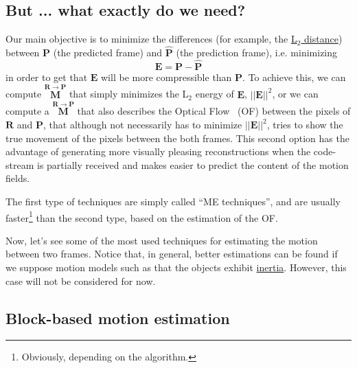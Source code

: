 \subsection{But ... what exactly do we need?}
Our main objective is to minimize the differences (for example, the
\href{https://en.wikipedia.org/wiki/Euclidean_distance}{L$_2$
  distance}) between ${\mathbf P}$ (the predicted frame) and $\hat{\mathbf P}$ (the
prediction frame), i.e. minimizing
\begin{equation}
  {\mathbf E} = {\mathbf P} - \hat{\mathbf P}
\end{equation}
in order to get that ${\mathbf E}$ will be more compressible than
${\mathbf P}$. To achieve this, we can compute $\overset{{\mathbf
    R}\rightarrow {\mathbf P}}{\mathbf M}$ that simply minimizes the
L$_2$ energy of ${\mathbf E}$, $||{\mathbf E}||^2$, or we can compute
a $\overset{{\mathbf R}\rightarrow {\mathbf P}}{\mathbf M}$ that also describes the Optical
Flow~\cite{horn1981determining} (OF) between the pixels of ${\mathbf
  R}$ and ${\mathbf P}$, that although not necessarily has to
minimize $||{\mathbf E}||^2$, tries to show the true movement of the
pixels between the both frames. This second option has the advantage
of generating more visually pleasing reconstructions when the
code-stream is partially received and makes easier to predict the
content of the motion fields.

The first type of techniques are simply called ``ME techniques'', and
are usually faster\footnote{Obviously, depending on the algorithm.}
than the second type, based on the estimation of the OF.


Now, let's see some of the most used techniques for estimating the
motion between two frames. Notice that, in general, better estimations
can be found if we suppose motion models such as that the objects
exhibit
\href{https://en.wikipedia.org/wiki/Inertia}{inertia}. However, this
case will not be considered for now.

\subsection{Block-based motion estimation~\cite{rao1996techniques}}

